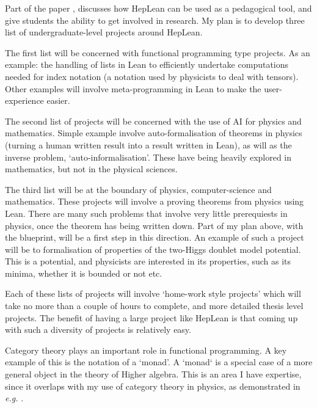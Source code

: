 \documentclass[14pt,letter]{article}
\newcounter{customtitle}
\begin{document}


Part of the paper , discusses how HepLean can be used 
as a pedagogical tool, and give students the ability to get involved in research.  My plan is to develop three list of undergraduate-level projects around HepLean. 

The first list will be concerned with functional programming type projects. As an example: the handling of lists in Lean to efficiently undertake computations needed for index notation (a notation used by physicists to deal with tensors). Other examples will involve meta-programming in Lean to make the user-experience easier.

The second list of projects  will be concerned with the use of AI for physics and mathematics. Simple example involve auto-formalisation of theorems in physics (turning a human written result into a result written in Lean), as will as the inverse problem, `auto-informalisation'. These have being heavily explored in mathematics, but not in the physical sciences. 

The third list will be at the boundary of physics, computer-science and mathematics. These projects will involve a proving theorems from physics using Lean. There are many such problems that involve very little prerequiests in physics, once the theorem has being written down. Part of my plan above, with the blueprint, will be a first step in this direction. An example of such a project will be to formalisation of properties of the two-Higgs doublet model potential. 
This is a potential, and physicists are interested in its properties, 
such as its minima, whether it is bounded or not etc.

Each of these lists of projects will involve `home-work style projects' which will take no more than a couple of hours to complete, and more detailed thesis level projects. The benefit of having a large project like HepLean is that coming up with such a diversity of projects is relatively easy. 


Category theory plays an important role in functional programming. A 
key example of this is the notation of a `monad'. A `monad` is 
a special case of a more general object in the theory of Higher algebra. 
This is an area I have expertise, since it overlaps with my use of category theory in physics, as demonstrated in \emph{e.g.} \js{}. 
\end{document}
